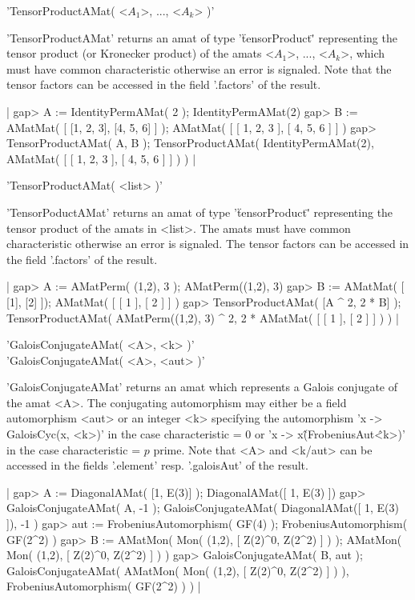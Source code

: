 
'TensorProductAMat( <$A_1$>, ..., <$A_k$> )'

'TensorProductAMat' returns an amat of type '\"tensorProduct\"' 
representing the tensor product (or Kronecker product) of the 
amats <$A_1$>, ..., <$A_k$>, 
which must have common characteristic otherwise an error is signaled.
Note that the tensor factors can be accessed in the field '.factors' of 
the result.

|    gap> A := IdentityPermAMat( 2 );
    IdentityPermAMat(2)
    gap> B := AMatMat( [ [1, 2, 3], [4, 5, 6] ] );
    AMatMat(
      [ [ 1, 2, 3 ], [ 4, 5, 6 ] ]
    )
    gap> TensorProductAMat( A, B );
    TensorProductAMat(
      IdentityPermAMat(2),
      AMatMat(
        [ [ 1, 2, 3 ], [ 4, 5, 6 ] ]
      )
    ) |

'TensorProductAMat( <list> )'

'TensorPoductAMat' returns an amat of type '\"tensorProduct\"' 
representing the tensor product of the amats in <list>. 
The amats must have common characteristic otherwise an error 
is signaled. The tensor factors can be accessed in the field 
'.factors' of the result.

|    gap> A := AMatPerm( (1,2), 3 );
    AMatPerm((1,2), 3)
    gap> B := AMatMat( [ [1], [2] ]);
    AMatMat(
      [ [ 1 ], [ 2 ] ]
    )
    gap> TensorProductAMat( [A ^ 2, 2 * B] );
    TensorProductAMat(
      AMatPerm((1,2), 3) ^ 2,
      2 * AMatMat(
        [ [ 1 ], [ 2 ] ]
      )
    ) |


'GaloisConjugateAMat( <A>, <k> )'\\
'GaloisConjugateAMat( <A>, <aut> )'

'GaloisConjugateAMat' returns an amat which represents a Galois 
conjugate of the amat <A>. The 
conjugating automorphism may either be a field automorphism <aut>
or an integer <k> specifying the automorphism 'x -> GaloisCyc(x, <k>)'
in the case characteristic = 0 or 'x -> x\^(FrobeniusAut\^<k>)' 
in the case characteristic = $p$ prime.
Note that <A> and <k/aut> can be accessed in the fields '.element' resp.
'.galoisAut' of the result.

|    gap> A := DiagonalAMat( [1, E(3)] );
    DiagonalAMat([ 1, E(3) ])
    gap> GaloisConjugateAMat( A, -1 );
    GaloisConjugateAMat(
      DiagonalAMat([ 1, E(3) ]),
      -1
    )
    gap> aut := FrobeniusAutomorphism( GF(4) );
    FrobeniusAutomorphism( GF(2^2) )
    gap> B := AMatMon( Mon( (1,2), [ Z(2)^0, Z(2^2) ] ) );
    AMatMon( Mon(
      (1,2),
      [ Z(2)^0, Z(2^2) ]
    ) )
    gap> GaloisConjugateAMat( B, aut );
    GaloisConjugateAMat(
      AMatMon( Mon(
        (1,2),
        [ Z(2)^0, Z(2^2) ]
      ) ),
      FrobeniusAutomorphism( GF(2^2) )
    ) |

